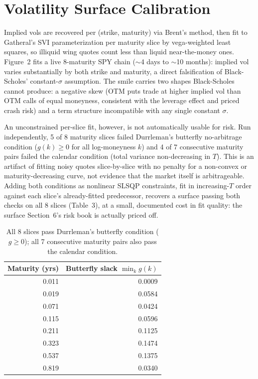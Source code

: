 \documentclass[10pt]{article}
\begin{document}
\section{Volatility Surface Calibration}
Implied vols are recovered per (strike, maturity) via Brent's method, then fit to Gatheral's SVI parameterization per maturity slice by vega-weighted least squares, so illiquid wing quotes count less than liquid near-the-money ones. Figure~2 fits a live 8-maturity SPY chain ($\sim$4 days to $\sim$10 months): implied vol varies substantially by both strike and maturity, a direct falsification of Black-Scholes' constant-$\sigma$ assumption. The smile carries two shapes Black-Scholes cannot produce: a negative skew (OTM puts trade at higher implied vol than OTM calls of equal moneyness, consistent with the leverage effect and priced crash risk) and a term structure incompatible with any single constant $\sigma$.

An unconstrained per-slice fit, however, is not automatically usable for risk. Run independently, 5 of 8 maturity slices failed Durrleman's butterfly no-arbitrage condition ($g(k)\ge0$ for all log-moneyness $k$) and 4 of 7 consecutive maturity pairs failed the calendar condition (total variance non-decreasing in $T$). This is an artifact of fitting noisy quotes slice-by-slice with no penalty for a non-convex or maturity-decreasing curve, not evidence that the market itself is arbitrageable. Adding both conditions as nonlinear SLSQP constraints, fit in increasing-$T$ order against each slice's already-fitted predecessor, recovers a surface passing both checks on all 8 slices (Table~3), at a small, documented cost in fit quality: the surface Section~6's risk book is actually priced off.

\begin{table}[h]
\centering \small
\begin{tabular}{@{}rr@{}}
\toprule
Maturity (yrs) & Butterfly slack $\min_k g(k)$ \\
\midrule
0.011 & 0.0009 \\
0.019 & 0.0584 \\
0.071 & 0.0424 \\
0.115 & 0.0596 \\
0.211 & 0.1125 \\
0.323 & 0.1474 \\
0.537 & 0.1375 \\
0.819 & 0.0340 \\
\bottomrule
\end{tabular}
\caption{All 8 slices pass Durrleman's butterfly condition ($g\ge0$); all 7 consecutive maturity pairs also pass the calendar condition.}
\end{table}
\end{document}
